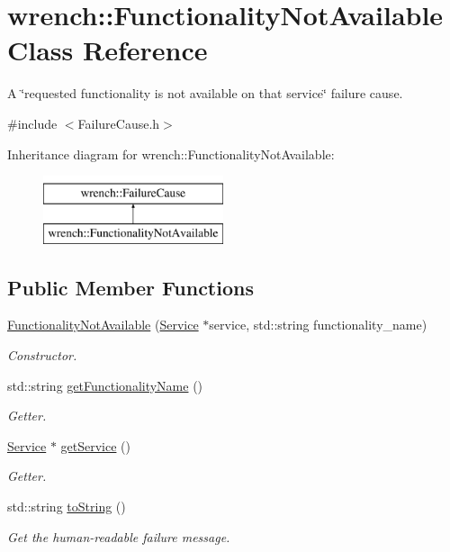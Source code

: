 \hypertarget{classwrench_1_1_functionality_not_available}{}\section{wrench\+:\+:Functionality\+Not\+Available Class Reference}
\label{classwrench_1_1_functionality_not_available}


A \char`\"{}requested functionality is not available on that service\char`\"{} failure cause.  




{\ttfamily \#include $<$Failure\+Cause.\+h$>$}

Inheritance diagram for wrench\+:\+:Functionality\+Not\+Available\+:\begin{figure}[H]
\begin{center}
\leavevmode
\includegraphics[height=2.000000cm]{classwrench_1_1_functionality_not_available}
\end{center}
\end{figure}
\subsection*{Public Member Functions}
\begin{DoxyCompactItemize}
\item 
\hyperlink{classwrench_1_1_functionality_not_available_a671895dd6d4ceef68e0311b47935b849}{Functionality\+Not\+Available} (\hyperlink{classwrench_1_1_service}{Service} $\ast$service, std\+::string functionality\+\_\+name)
\begin{DoxyCompactList}\small\item\em Constructor. \end{DoxyCompactList}\item 
std\+::string \hyperlink{classwrench_1_1_functionality_not_available_ab08a243a126daa6dfc538a7429f656b0}{get\+Functionality\+Name} ()
\begin{DoxyCompactList}\small\item\em Getter. \end{DoxyCompactList}\item 
\hyperlink{classwrench_1_1_service}{Service} $\ast$ \hyperlink{classwrench_1_1_functionality_not_available_a0c29976839df8de89c833e135f754bbb}{get\+Service} ()
\begin{DoxyCompactList}\small\item\em Getter. \end{DoxyCompactList}\item 
std\+::string \hyperlink{classwrench_1_1_functionality_not_available_af19ea11f7e3d50d0bea7c8a66b7b1221}{to\+String} ()
\begin{DoxyCompactList}\small\item\em Get the human-\/readable failure message. \end{DoxyCompactList}\end{DoxyCompactItemize}
